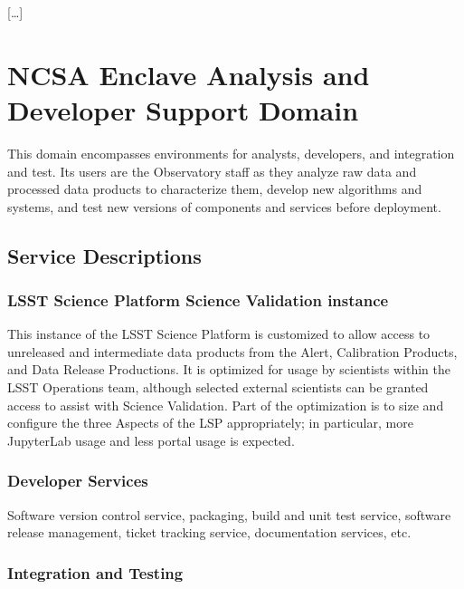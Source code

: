 \documentclass[]{article}
\begin{document}
{[}\ldots{}{]}

\section{NCSA Enclave Analysis and Developer Support
Domain}\label{ncsa-enclave-analysis-and-developer-support-domain}

This domain encompasses environments for analysts, developers, and
integration and test. Its users are the Observatory staff as they
analyze raw data and processed data products to characterize them,
develop new algorithms and systems, and test new versions of components
and services before deployment.

\subsection{Service Descriptions}\label{service-descriptions-4}

\subsubsection{LSST Science Platform Science Validation
instance}\label{lsst-science-platform-science-validation-instance}

This instance of the LSST Science Platform is customized to allow access
to unreleased and intermediate data products from the Alert, Calibration
Products, and Data Release Productions. It is optimized for usage by
scientists within the LSST Operations team, although selected external
scientists can be granted access to assist with Science Validation. Part
of the optimization is to size and configure the three Aspects of the
LSP appropriately; in particular, more JupyterLab usage and less portal
usage is expected.

\subsubsection{Developer Services}\label{developer-services}

Software version control service, packaging, build and unit test
service, software release management, ticket tracking service,
documentation services, etc.

\subsubsection{Integration and Testing}\label{integration-and-testing}
\end{document}
